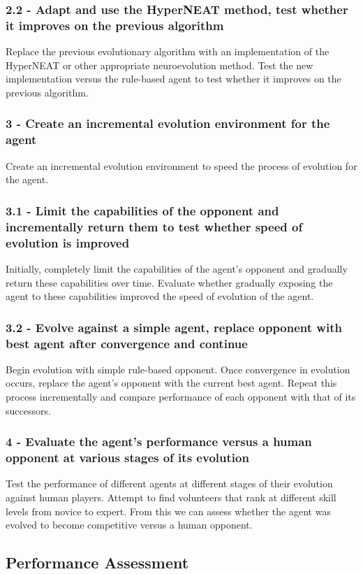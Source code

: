 \documentclass[11pt,a4paper]{article}
\begin{document}
\subsubsection*{2.2 - Adapt and use the HyperNEAT method, test whether it improves on the previous algorithm}
Replace the previous evolutionary algorithm with an implementation of the HyperNEAT or other appropriate neuroevolution method. Test the new implementation versus the rule-based agent to test whether it improves on the previous algorithm.
\subsubsection*{3 - Create an incremental evolution environment for the agent}
Create an incremental evolution environment to speed the process of evolution for the agent.
\subsubsection*{3.1 - Limit the capabilities of the opponent and incrementally return them to test whether speed of evolution is improved}
Initially, completely limit the capabilities of the agent's opponent and gradually return these capabilities over time. Evaluate whether gradually exposing the agent to these capabilities improved the speed of evolution of the agent.
\subsubsection*{3.2 - Evolve against a simple agent, replace opponent with best agent after convergence and continue}
Begin evolution with simple rule-based opponent. Once convergence in evolution occurs, replace the agent's opponent with the current best agent. Repeat this process incrementally and compare performance of each opponent with that of its successors.
\subsubsection*{4 - Evaluate the agent's performance versus a human opponent at various stages of its evolution}
Test the performance of different agents at different stages of their evolution against human players. Attempt to find volunteers that rank at different skill levels from novice to expert. From this we can assess whether the agent was evolved to become competitive versus a human opponent.

\newpage
\subsection{Performance Assessment}
\end{document}
